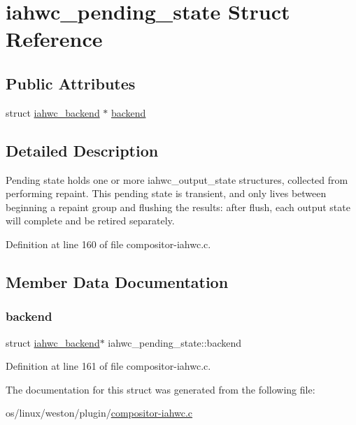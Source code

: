 \hypertarget{structiahwc__pending__state}{}\section{iahwc\+\_\+pending\+\_\+state Struct Reference}
\label{structiahwc__pending__state}
\subsection*{Public Attributes}
\begin{DoxyCompactItemize}
\item 
struct \mbox{\hyperlink{structiahwc__backend}{iahwc\+\_\+backend}} $\ast$ \mbox{\hyperlink{structiahwc__pending__state_a3214eb70000dc28955b6d065d533d1eb}{backend}}
\end{DoxyCompactItemize}


\subsection{Detailed Description}
Pending state holds one or more iahwc\+\_\+output\+\_\+state structures, collected from performing repaint. This pending state is transient, and only lives between beginning a repaint group and flushing the results\+: after flush, each output state will complete and be retired separately. 

Definition at line 160 of file compositor-\/iahwc.\+c.



\subsection{Member Data Documentation}
\mbox{\label{structiahwc__pending__state_a3214eb70000dc28955b6d065d533d1eb}} 
\subsubsection{\texorpdfstring{backend}{backend}}
{\footnotesize\ttfamily struct \mbox{\hyperlink{structiahwc__backend}{iahwc\+\_\+backend}}$\ast$ iahwc\+\_\+pending\+\_\+state\+::backend}



Definition at line 161 of file compositor-\/iahwc.\+c.



The documentation for this struct was generated from the following file\+:\begin{DoxyCompactItemize}
\item 
os/linux/weston/plugin/\mbox{\hyperlink{compositor-iahwc_8c}{compositor-\/iahwc.\+c}}\end{DoxyCompactItemize}
